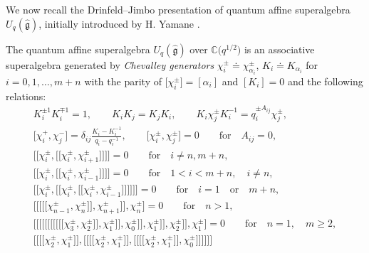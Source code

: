 \documentclass[10pt,a4paper]{amsart}
\numberwithin{equation}{section}
\begin{document}
We now recall the Drinfeld--Jimbo presentation of quantum affine superalgebra
$U_q(\mathfrak{\hat{g}})$, initially introduced by H. Yamane \cite{HYAM}.
\begin{Definition}
The quantum affine superalgebra $U_q(\mathfrak{\hat{g}})$ over $\mathbb{C}\bigl(q^{1/2}\bigr)$ is an associative superalgebra generated by \emph{Chevalley generators} $\chi_i^{\pm}\doteq\chi_{\alpha_i}^{\pm}$, $K_i\doteq K_{\alpha_i}$ for $i=0,1,\dots,m+n$ with the parity of $\bigl[\chi_i^{\pm}\bigr]=[\alpha_i]$ and $[K_i]=0$ and the following relations:
\begin{gather*}%
 K_i^{\pm 1}K_i^{\mp 1}=1,\qquad K_iK_j=K_jK_i, \qquad
 K_i\chi_j^{\pm}K_i^{-1}=q_i^{\pm A_{ij}}\chi_j^{\pm}, \\
\bigl[\chi_i^+, \chi_j^-\bigr]=\delta_{ij}\frac{K_i-K_i^{-1}}{q_i-q_i^{-1}}, \qquad
\bigl[\chi_i^{\pm}, \chi_j^{\pm}\bigr]=0\qquad \textrm{for}\quad A_{ij}=0,\\
 \bigl[\!\!\bigl[\chi_i^{\pm},\bigl[\!\!\bigl[\chi_i^{\pm}, \chi_{i+1}^{\pm}\bigr]\!\!\bigr] \bigr]\!\!\bigr]=0\qquad\textrm{for}\quad i\neq n,m+n,
\\
 \bigl[\!\!\bigl[\chi_i^{\pm},\bigl[\!\!\bigl[\chi_i^{\pm}, \chi_{i-1}^{\pm}\bigr]\!\!\bigr] \bigr]\!\!\bigr]=0\qquad\textrm{for}\quad 1<i<m+n,\quad i\neq n,
\\
 \bigl[\!\!\bigl[\chi_i^{\pm}, \bigl[\!\!\bigl[\chi_i^{\pm},\bigl[\!\!\bigl[\chi_i^{\pm}, \chi_{i-1}^{\pm}\bigr]\!\!\bigr] \bigr]\!\!\bigr] \bigr]\!\!\bigr]=0\qquad\textrm{for}\quad i=1\quad\textrm{or}\quad m+n, \\
 \bigl[ \bigl[\!\!\bigl[ \bigl[\!\!\bigl[\chi_{n-1}^{\pm}, \chi_n^{\pm}\bigr]\!\!\bigr], \chi_{n+1}^{\pm}\bigr]\!\!\bigr], \chi_n^{\pm}\bigr]=0\qquad\textrm{for}\quad n>1, \\
 \bigl[ \bigl[\!\!\bigl[ \bigl[\!\!\bigl[ \bigl[\!\!\bigl[ \bigl[\!\!\bigl[ \bigl[\!\!\bigl[\chi_3^{\pm}, \chi_2^{\pm}\bigr]\!\!\bigr], \chi_1^{\pm}\bigr]\!\!\bigr], \chi_0^{\pm}\bigr]\!\!\bigr], \chi_1^{\pm}\bigr]\!\!\bigr], \chi_2^{\pm}\bigr]\!\!\bigr], \chi_1^{\pm}\bigr]=0
\qquad\textrm{for} \quad n=1,\quad m\geq 2,\\
 \bigl[\!\!\bigl[ \bigl[\!\!\bigl[\chi_2^{\pm}, \chi_1^{\pm}\bigr]\!\!\bigr], \bigl[\!\!\bigl[ \bigl[\!\!\bigl[\chi_2^{\pm}, \chi_1^{\pm}\bigr]\!\!\bigr], \bigl[\!\!\bigl[ \bigl[\!\!\bigl[\chi_2^{\pm}, \chi_1^{\pm}\bigr]\!\!\bigr], \chi_0^{\pm}\bigr]\!\!\bigr] \bigr]\!\!\bigr] \bigr]\!\!\bigr] \\

\end{gather*}
\end{Definition}
\end{document}
